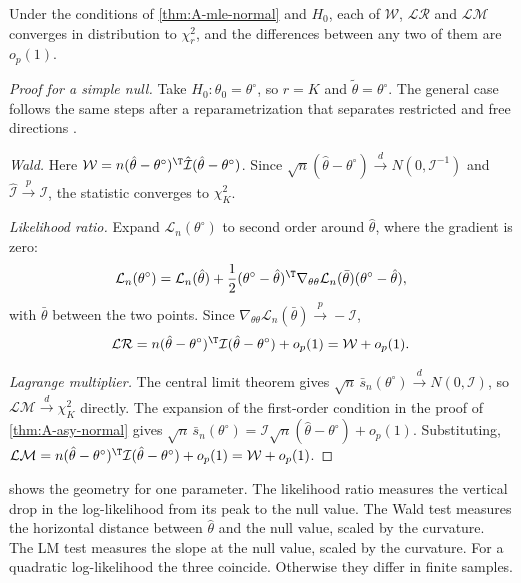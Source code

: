 \begin{theorem}\label{thm:A-trinity}
Under the conditions of \cref{thm:A-mle-normal} and $H_0$, each of $\mathcal{W}$, $\mathcal{LR}$ and $\mathcal{LM}$ converges
in distribution to $\chi^2_r$, and the differences between any two of them are $o_p(1)$.
\end{theorem}

\begin{proof}[Proof for a simple null]
Take $H_0: \theta_0 = \theta^\circ$, so $r = K$ and $\tilde\theta = \theta^\circ$. The general case follows the same steps
after a reparametrization that separates restricted and free directions \citep{Engle1984}.

\emph{Wald.} Here $\mathcal{W} = n(\hat\theta - \theta^\circ)^\T\hat{\mathcal{I}}(\hat\theta - \theta^\circ)$. Since
$\sqrt{n}(\hat\theta - \theta^\circ) \xrightarrow{d} N(0, \mathcal{I}^{-1})$ and $\hat{\mathcal{I}} \xrightarrow{p} \mathcal{I}$,
the statistic converges to $\chi^2_K$.

\emph{Likelihood ratio.} Expand $\mathcal{L}_n(\theta^\circ)$ to second order around $\hat\theta$, where the gradient is zero:
\begin{equation*}
  \mathcal{L}_n(\theta^\circ) = \mathcal{L}_n(\hat\theta) + \frac{1}{2}(\theta^\circ - \hat\theta)^\T\nabla_{\theta\theta}
  \mathcal{L}_n(\bar\theta)(\theta^\circ - \hat\theta),
\end{equation*}
with $\bar\theta$ between the two points. Since $\nabla_{\theta\theta}\mathcal{L}_n(\bar\theta) \xrightarrow{p} -\mathcal{I}$,
\begin{equation*}
  \mathcal{LR} = n(\hat\theta - \theta^\circ)^\T\mathcal{I}(\hat\theta - \theta^\circ) + o_p(1) = \mathcal{W} + o_p(1).
\end{equation*}

\emph{Lagrange multiplier.} The central limit theorem gives $\sqrt{n}\,\bar s_n(\theta^\circ) \xrightarrow{d} N(0, \mathcal{I})$,
so $\mathcal{LM} \xrightarrow{d} \chi^2_K$ directly. The expansion of the first-order condition in the proof of
\cref{thm:A-asy-normal} gives $\sqrt{n}\,\bar s_n(\theta^\circ) = \mathcal{I}\sqrt{n}(\hat\theta - \theta^\circ) + o_p(1)$.
Substituting, $\mathcal{LM} = n(\hat\theta - \theta^\circ)^\T\mathcal{I}(\hat\theta - \theta^\circ) + o_p(1) = \mathcal{W} +
o_p(1)$.
\end{proof}

 shows the geometry for one parameter. The likelihood ratio measures the vertical drop in the
log-likelihood from its peak to the null value. The Wald test measures the horizontal distance between $\hat\theta$ and the
null value, scaled by the curvature. The LM test measures the slope at the null value, scaled by the curvature. For a
quadratic log-likelihood the three coincide. Otherwise they differ in finite samples.

